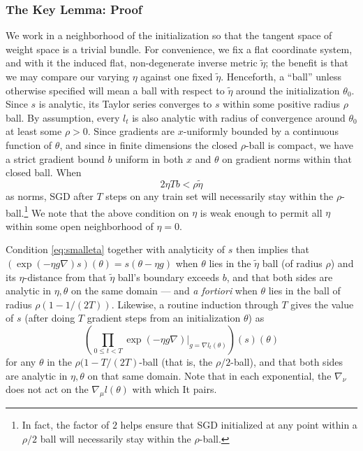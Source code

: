 \documentclass{article}
\theoremstyle{plain}
\theoremstyle{definition}
\newcommand{\wrap}[1]{\left(#1\right)}
\begin{document}
        \subsubsection*{The Key Lemma: Proof}
            We work in a neighborhood of the initialization so that the tangent
            space of weight space is a trivial bundle.  For convenience, we fix
            a flat coordinate system, and with it the induced flat,
            non-degenerate inverse metric $\tilde\eta$; the benefit is that we
            may compare our varying $\eta$ against one fixed $\tilde\eta$.
            Henceforth, a ``ball'' unless otherwise specified will mean a ball
            with respect to $\tilde\eta$ around the initialization $\theta_0$.
            Since $s$ is analytic, its Taylor series converges to $s$ within
            some positive radius $\rho$ ball.  By assumption, every $l_t$ is
            also analytic with radius of convergence around $\theta_0$ at least
            some $\rho>0$.  Since gradients are $x$-uniformly
            bounded by a continuous function of $\theta$, and since in finite
            dimensions the closed $\rho$-ball is compact, we have a strict
            gradient bound $b$ uniform in both $x$ and $\theta$ on gradient
            norms within that closed ball.  When
            \begin{equation} \label{eq:smalleta}
                2 \eta T b < \rho \tilde\eta
            \end{equation}
            as norms, SGD after $T$ steps on any train set
            will necessarily stay within the $\rho$-ball.\footnote{
                In fact, the factor of $2$ helps ensure that SGD initialized at
                any point within a $\rho/2$ ball will necessarily stay within
                the $\rho$-ball.
            } We note that the above condition on $\eta$ is weak enough to
            permit all $\eta$ within some open neighborhood of $\eta=0$.  

            Condition \ref{eq:smalleta} together with analyticity of $s$ then
            implies that
            $
                \wrap{\exp(-\eta g \nabla) s}(\theta) = s(\theta - \eta g)
            $
            when $\theta$ lies in the $\tilde\eta$ ball (of radius $\rho$) and
            its $\eta$-distance from that $\tilde\eta$ ball's boundary exceeds
            $b$, and that both sides are analytic in $\eta, \theta$ on the same
            domain --- and \emph{a fortiori} when $\theta$ lies in the ball of
            radius $\rho (1 - 1/(2T))$.  Likewise, a routine induction through
            $T$ gives the value of $s$ (after doing $T$ gradient steps from an
            initialization $\theta$) as
            $$
                \wrap{
                    \prod_{0\leq t<T}
                        \left.
                            \exp(-\eta g \nabla)
                        \right|_{g=\nabla l_t(\theta)}
                }
                (s)(\theta)
            $$
            for any $\theta$ in the $\rho (1-T/(2T)$-ball (that is, the
            $\rho/2$-ball), and that both sides are analytic in $\eta, \theta$
            on that same domain.  Note that in each exponential, the
            $\nabla_\nu$ does not act on the $\nabla_\mu l(\theta)$ with which
            It pairs.  
\end{document}
